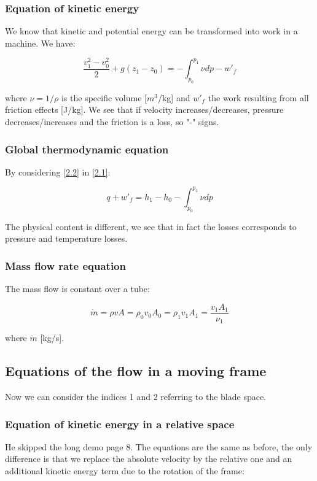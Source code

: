 \subsubsection{Equation of kinetic energy}
We know that kinetic and potential energy can be transformed into work in a machine. We have:

\begin{equation}
 \frac{v_1^2 - v_0^2}{2} + g(z_1-z_0) = - \int _{p_0}^{p_1} \nu dp - w'_f
 \label{2.2}
\end{equation}

where $\nu = 1/\rho$ is the specific volume [$m^3$/kg] and $w'_f$ the work resulting from all friction effects [J/kg]. We see that if velocity increases/decreases, pressure decreases/increases and the friction is a loss, so "-" signs. 

\subsubsection{Global thermodynamic equation}
By considering \eqref{2.2} in \eqref{2.1}: 

\begin{equation}
q + w'_f = h_1 - h_0  - \int _{p_0}^{p_1} \nu dp
\end{equation}

The physical content is different, we see that in fact the losses corresponds to pressure and temperature losses. 

\subsubsection{Mass flow rate equation}
The mass flow is constant over a tube: 

\begin{equation}
\dot{m} = \rho v A = \rho_0 v_0 A_0 = \rho_1 v_1 A_1 = \frac{v_1 A_1}{\nu _1}  
\end{equation}

where $\dot{m}$ [kg/s].

\subsection{Equations of the flow in a moving frame}
Now we can consider the indices 1 and 2 referring to the blade space. 

\subsubsection{Equation of kinetic energy in a relative space}
He skipped the long demo page 8. The equations are the same as before, the only difference is that we replace the absolute velocity by the relative one and an additional kinetic energy term due to the rotation of the frame: 

